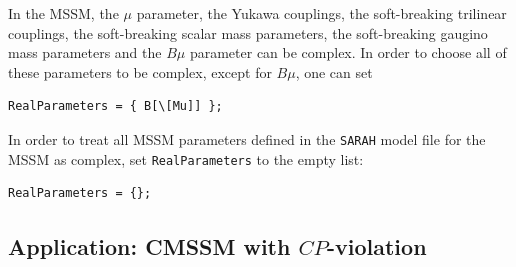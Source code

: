 \documentclass[final,3p,11pt,pdflatex]{elsarticle}
\makeatletter
\newcommand{\sarah}{\texttt{SARAH}\@\xspace}
\newcommand{\code}[1]{\lstinline|#1|}  %
\newcommand{\CP}{\ensuremath{CP}\xspace}
\makeatother
\begin{document}
\begin{example}
In the MSSM, the $\mu$ parameter, the Yukawa
couplings, the soft-breaking trilinear couplings, the soft-breaking
scalar mass parameters, the soft-breaking gaugino mass parameters and
the $B\mu$ parameter can be complex.  In order to choose all of these
parameters to be complex, except for $B\mu$, one can set
%
\begin{lstlisting}
RealParameters = { B[\[Mu]] };
\end{lstlisting}
\end{example}

\begin{example}
In order to treat all MSSM parameters defined in
the \sarah model file for the MSSM as complex, set \code{RealParameters} to the
empty list:
%
\begin{lstlisting}
RealParameters = {};
\end{lstlisting}
\end{example}

\subsection{Application: CMSSM with \CP-violation}
\end{document}
